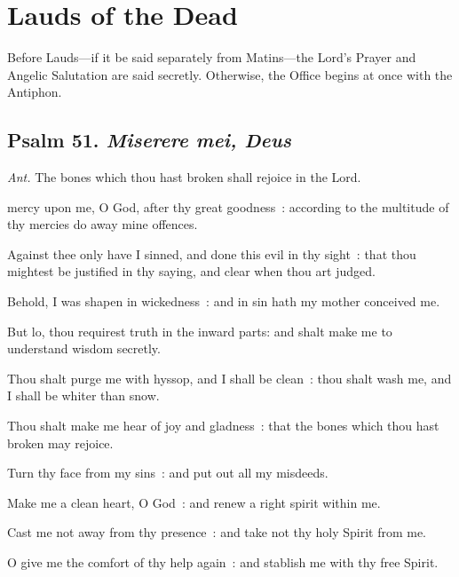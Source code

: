 \section{Lauds of the Dead}\label{laudsdead}
\begin{secrubric}
    Before Lauds---if it be said separately from Matins---the Lord's Prayer and Angelic Salutation are said secretly. Otherwise, the Office begins at once with the Antiphon.
\end{secrubric}
\subsection{Psalm 51. \textit{Miserere mei, Deus}}\par\noindent
\textit{Ant.} The bones which thou hast broken {\dag} shall rejoice in the Lord.\par
{} mercy upon me, O God, after thy great goodness~: according to the multitude of thy mercies do away mine offences.\par
{}
Against thee only have I sinned, and done this evil in thy sight~: that thou mightest be justified in thy saying, and clear when thou art judged.\par
{}Behold, I was shapen in wickedness~: and in sin hath my mother conceived me.\par
{}But lo, thou requirest truth in the inward parts: and shalt make me to understand wisdom secretly.\par
{}Thou shalt purge me with hyssop, and I shall be clean~: thou shalt wash me, and I shall be whiter than snow.\par
{}Thou shalt make me hear of joy and gladness~: that the bones which thou hast broken may rejoice.\par
{}Turn thy face from my sins~: and put out all my misdeeds.\par
{}Make me a clean heart, O God~: and renew a right spirit within me.\par
{}Cast me not away from thy presence~: and take not thy holy Spirit from me.\par
{}O give me the comfort of thy help again~: and stablish me with thy free Spirit.\par
